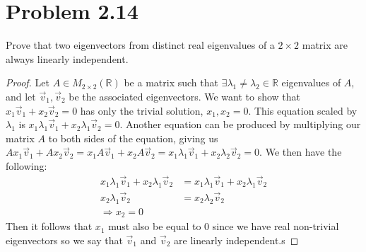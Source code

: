 \documentclass{article}
\theoremstyle{definition}
\begin{document}
\section*{Problem 2.14}
    Prove that two eigenvectors from distinct real eigenvalues of a $2 \times 2$ matrix are always linearly independent.
    \begin{proof}
        Let $A \in M_{2 \times 2}(\mathbb{R})$ be a matrix such that $\exists \lambda_1 \neq \lambda_2 \in \mathbb{R}$
        eigenvalues of $A$, and let $\vec{v}_1, \vec{v}_2$ be the associated eigenvectors.
        We want to show that $x_1 \vec{v}_1 + x_2 \vec{v}_2 = 0$ has only the trivial solution, $x_1,x_2 = 0$.
        This equation scaled by $\lambda_1$ is $x_1 \lambda_1 \vec{v}_1 + x_2 \lambda_1 \vec{v}_2 = 0$.
        Another equation can be produced by multiplying our matrix $A$ to both sides of the equation, giving us
        $Ax_1\vec{v}_1 + Ax_2\vec{v}_2 = x_1 A\vec{v}_1 + x_2 A\vec{v}_2 = x_1 \lambda_1 \vec{v}_1 + x_2 \lambda_2 \vec{v}_2 = 0$.
        We then have the following:
        \begin{align*}
            x_1 \lambda_1 \vec{v}_1 + x_2 \lambda_1 \vec{v}_2 & = x_1 \lambda_1 \vec{v}_1 + x_2 \lambda_1 \vec{v}_2 \\
            x_2 \lambda_1 \vec{v}_2 & =  x_2 \lambda_2 \vec{v}_2 \\
            \Longrightarrow x_2 = 0
        \end{align*}
        Then it follows that $x_1$ must also be equal to 0 since we have real non-trivial eigenvectors so we say that 
        $\vec{v}_1$ and $\vec{v}_2$ are linearly independent.s
    \end{proof}
\end{document}
